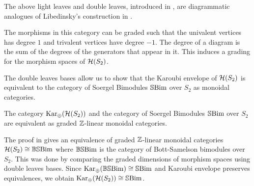 \begin{remark}
    The above light leaves and double leaves, introduced in \cite{elias-williamson-soergel-calculus}, are diagrammatic analogues of Libedinsky's construction in \cite{libedinsky-lightleavesbasis}.
\end{remark}

The morphisms in this category can be graded such that the univalent vertices has degree $1$ and trivalent vertices have degree $-1$. The degree of a diagram is the sum of the degrees of the generators that appear in it. This induces a grading for the morphism spaces of $\mathcal{H}(S_2)$. 


The double leaves bases allow us to show that the Karoubi envelope of $\mathcal{H}(S_2)$ is equivalent to the category of Soergel Bimodules $\operatorname{\mathbb{S}Bim}$ over $S_2$ as monoidal categories.

\begin{theorem} \label{thm:one-col-sbim-equiv}
    The category $\operatorname{Kar_\oplus}(\mathcal{H}(S_2))$ and the category of Soergel Bimodules $\operatorname{\mathbb{S}Bim}$ over $S_2$ are equivalent as graded $\mathbb{Z}$-linear monoidal categories.
\end{theorem}
The proof in \cite{elias-williamson-soergel-calculus} gives an equivalence of graded $\mathbb{Z}$-linear monoidal categories $\mathcal{H}(S_2) \cong \operatorname{\mathbb{BS}Bim}$ where $\operatorname{\mathbb{BS}Bim}$ is the category of Bott-Samelson bimodules over $S_2$. This was done by comparing the graded dimensions of morphism spaces using double leaves bases. Since $\operatorname{Kar_\oplus}(\operatorname{\mathbb{BS}Bim}) \cong \operatorname{\mathbb{S}Bim}$ and Karoubi envelope preserves equivalences, we obtain $\operatorname{Kar_\oplus}(\mathcal{H}(S_2)) \cong \operatorname{\mathbb{S}Bim}$.

